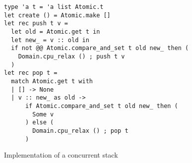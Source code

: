 \begin{figure}[htb]
\begin{verbatim}
type 'a t = 'a list Atomic.t
let create () = Atomic.make []
let rec push t v =
  let old = Atomic.get t in
  let new_ = v :: old in
  if not @@ Atomic.compare_and_set t old new_ then (
    Domain.cpu_relax () ; push t v
  )
let rec pop t =
  match Atomic.get t with
  | [] -> None
  | v :: new_ as old ->
      if Atomic.compare_and_set t old new_ then (
        Some v
      ) else (
        Domain.cpu_relax () ; pop t
      )
\end{verbatim}
\caption{Implementation of a concurrent stack}
\label{fig:stack}
\end{figure}